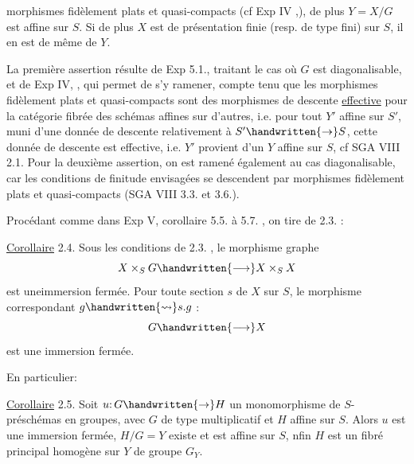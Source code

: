 morphismes fidèlement plats et quasi-compacts (cf Exp IV ,), de plus
$Y=X/G$ est affine sur $S$. Si de plus $X$ est de présentation finie (resp.
de type fini) sur $S$, il en est de même de $Y$.

La première assertion résulte de Exp  5.1.,  traitant le cas où
$G$ est diagonalisable, et de Exp IV, , qui permet de s'y ramener, compte
tenu que les morphismes fidèlement plats et quasi-compacts  sont des morphismes de descente \uline{effective} pour la catégorie fibrée des schémas affines sur
d'autres, i.e. pour tout $Y'$ affine sur $S'$, muni d'une donnée de descente
relativement à $S'\handwritten{\to}S$, cette donnée de descente est effective, i.e. $Y'$
provient d'un $Y$ affine sur $S$, cf SGA VIII\deleted{\unsure{,}} 2.1. Pour la deuxième assertion, on est ramené également au cas diagonalisable, car les conditions de
finitude envisagées se descendent par morphismes fidèlement plats et
quasi-compacts  (SGA VIII 3.3. et 3.6.). 

Procédant comme dans Exp V, corollaire 5.5.
à 5.7. , on tire de 2.3. :

\uline{Corollaire} 2.4. Sous les conditions de 2.3. , le morphisme graphe
\[
X\times_S G\handwritten{\longrightarrow}X\times_S X
\]
est une\handwritten{\unsure{/}}immersion fermée. Pour toute section $s$ de $X$ sur $S$, le morphisme
correspondant $g\handwritten{\leadsto}s.g$ :
\[
G\handwritten{\longrightarrow}X
\]
est une immersion fermée.

En particulier:

\uline{Corollaire} 2.5. Soit $u\mathpunct{:}G\handwritten{\to}H$ un monomorphisme de $S$-préschémas en groupes, avec $G$ de type multiplicatif et $H$ affine sur $S$. Alors $u$ est une
immersion fermée,  $H/G=Y$ existe et est affine sur $S$, nfin $H$ est un
fibré principal homogène sur $Y$ de groupe $G_Y$.
